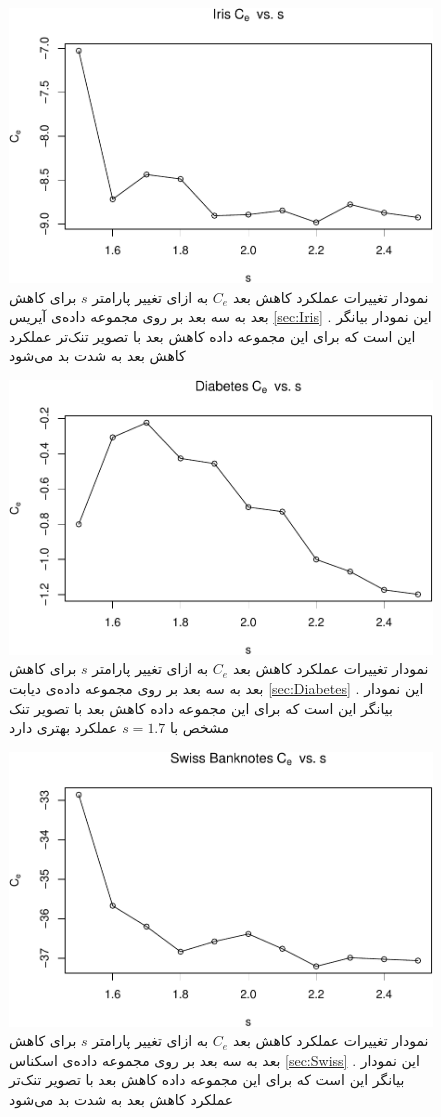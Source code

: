 \begin{figure}[H]
\centering
\includegraphics[width=0.7\linewidth]{Report_files/figure-latex/unnamed-chunk-26-2}
\caption{
نمودار تغییرات عملکرد کاهش بعد 
$C_e$
به ازای تغییر پارامتر
$s$
برای کاهش بعد به 
سه بعد بر روی مجموعه داده‌‌‌ی 
آیریس
\ref{sec:Iris}
. این نمودار بیانگر این است که برای این مجموعه داده کاهش بعد 
با تصویر تنک‌تر عملکرد کاهش بعد به شدت بد می‌شود
}
\end{figure}

\begin{figure}[H]
\centering
\includegraphics[width=0.7\linewidth]{Report_files/figure-latex/unnamed-chunk-26-3}
\caption{
نمودار تغییرات عملکرد کاهش بعد 
$C_e$
به ازای تغییر پارامتر
$s$
برای کاهش بعد به 
سه بعد بر روی مجموعه داده‌‌‌ی 
دیابت
\ref{sec:Diabetes}
. این نمودار بیانگر این است که برای این مجموعه داده کاهش بعد 
با تصویر تنک‌ مشخص با 
$s=1.7$
 عملکرد بهتری دارد
}
\end{figure}

\begin{figure}[H]
\centering
\includegraphics[width=0.7\linewidth]{Report_files/figure-latex/unnamed-chunk-26-4}
\caption{
نمودار تغییرات عملکرد کاهش بعد 
$C_e$
به ازای تغییر پارامتر
$s$
برای کاهش بعد به 
سه بعد بر روی مجموعه داده‌‌‌ی 
اسکناس
\ref{sec:Swiss}
. این نمودار بیانگر این است که برای این مجموعه داده کاهش بعد 
با تصویر تنک‌تر عملکرد کاهش بعد به شدت بد می‌شود
}
\end{figure}

